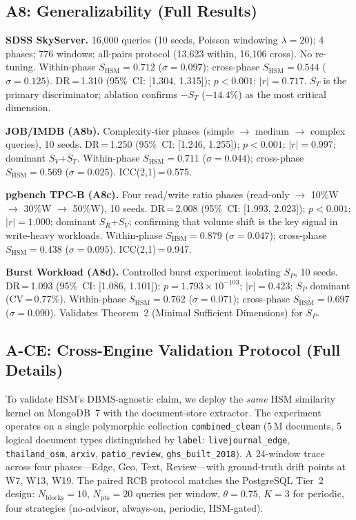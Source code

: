 \documentclass[10pt,twocolumn,a4paper]{article}
\newcommand{\SHSM}{S_{\mathrm{HSM}}}
\newcommand{\SR}{S_{R}}
\newcommand{\SV}{S_{V}}
\newcommand{\ST}{S_{T}}
\newcommand{\SPER}{S_{P}}
\newcommand{\Npts}{N_{\mathrm{pts}}}
\begin{document}
\subsection{A8: Generalizability (Full Results)}

\textbf{SDSS SkyServer.} 16{,}000 queries
(10 seeds, Poisson windowing $\lambda\!=\!20$); 4 phases; 776 windows;
all-pairs protocol (13{,}623 within, 16{,}106 cross). No re-tuning.
Within-phase $\SHSM\!=\!0.712$ ($\sigma\!=\!0.097$);
cross-phase $\SHSM\!=\!0.544$ ($\sigma\!=\!0.125$).
DR\,=\,1.310 (95\%~CI: [1.304, 1.315]);
$p\!<\!0.001$; $|r|\!=\!0.717$.
$\ST$ is the primary discriminator;
ablation confirms $-\ST$ ($-14.4\%$) as the most critical dimension.

\textbf{JOB/IMDB (A8b).} Complexity-tier phases (simple $\to$ medium $\to$
complex queries), 10 seeds. DR\,=\,1.250 (95\%~CI: [1.246, 1.255]);
$p\!<\!0.001$; $|r|\!=\!0.997$; dominant $\SV$+$\ST$.
Within-phase $\SHSM\!=\!0.711$ ($\sigma\!=\!0.044$);
cross-phase $\SHSM\!=\!0.569$ ($\sigma\!=\!0.025$).
ICC(2,1)\,=\,0.575.

\textbf{pgbench TPC-B (A8c).} Four read/write ratio phases (read-only
$\to$ 10\%W $\to$ 30\%W $\to$ 50\%W), 10 seeds. DR\,=\,2.008
(95\%~CI: [1.993, 2.023]); $p\!<\!0.001$; $|r|\!=\!1.000$; dominant $\SR$+$\SV$;
confirming that volume shift is the key signal in write-heavy workloads.
Within-phase $\SHSM\!=\!0.879$ ($\sigma\!=\!0.047$);
cross-phase $\SHSM\!=\!0.438$ ($\sigma\!=\!0.095$).
ICC(2,1)\,=\,0.947.

\textbf{Burst Workload (A8d).} Controlled burst experiment
isolating $\SPER$, 10 seeds.
DR\,=\,1.093 (95\%~CI: [1.086, 1.101]); $p\!=\!1.793\times10^{-103}$;
$|r|\!=\!0.423$; $\SPER$ dominant (CV\,=\,0.77\%).
Within-phase $\SHSM\!=\!0.762$ ($\sigma\!=\!0.071$);
cross-phase $\SHSM\!=\!0.697$ ($\sigma\!=\!0.090$).
Validates Theorem~2 (Minimal Sufficient
Dimensions) for $\SPER$.

\subsection{A-CE: Cross-Engine Validation Protocol (Full Details)}

To validate HSM's DBMS-agnostic claim,
we deploy the \emph{same} HSM similarity kernel on MongoDB~7 with the
document-store extractor. The experiment operates on a single
polymorphic collection \texttt{combined\_clean} (5\,M documents,
5 logical document types distinguished by \texttt{label}:
\texttt{livejournal\_edge}, \texttt{thailand\_osm}, \texttt{arxiv},
\texttt{patio\_review}, \texttt{ghs\_built\_2018}).
A 24-window trace across four phases---Edge, Geo, Text, Review---with
ground-truth drift points at W7, W13, W19.
The paired RCB protocol matches the PostgreSQL Tier~2 design:
$N_{\mathrm{blocks}}\!=\!10$, $\Npts\!=\!20$ queries per window,
$\theta\!=\!0.75$, $K\!=\!3$ for periodic, four strategies
(no-advisor, always-on, periodic, HSM-gated).
\end{document}
